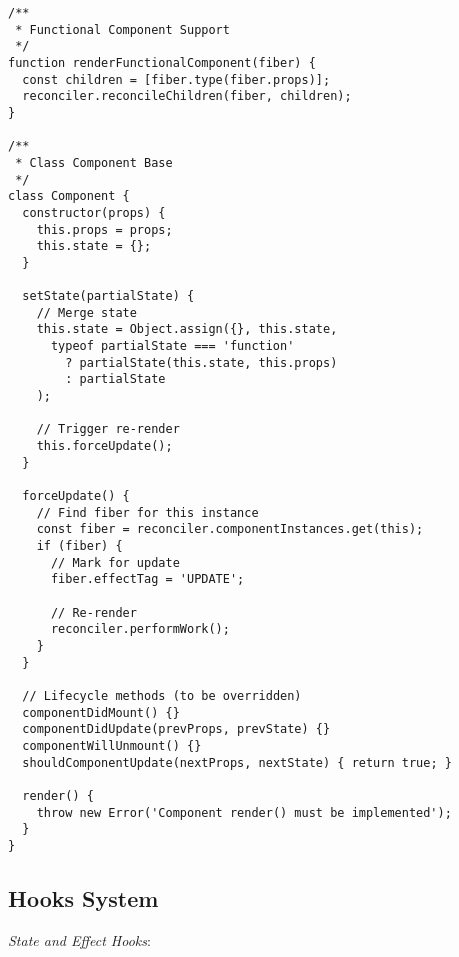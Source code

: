 \documentclass[11pt]{article}
\begin{document}
\begin{verbatim}
/**
 * Functional Component Support
 */
function renderFunctionalComponent(fiber) {
  const children = [fiber.type(fiber.props)];
  reconciler.reconcileChildren(fiber, children);
}

/**
 * Class Component Base
 */
class Component {
  constructor(props) {
    this.props = props;
    this.state = {};
  }
  
  setState(partialState) {
    // Merge state
    this.state = Object.assign({}, this.state, 
      typeof partialState === 'function' 
        ? partialState(this.state, this.props)
        : partialState
    );
    
    // Trigger re-render
    this.forceUpdate();
  }
  
  forceUpdate() {
    // Find fiber for this instance
    const fiber = reconciler.componentInstances.get(this);
    if (fiber) {
      // Mark for update
      fiber.effectTag = 'UPDATE';
      
      // Re-render
      reconciler.performWork();
    }
  }
  
  // Lifecycle methods (to be overridden)
  componentDidMount() {}
  componentDidUpdate(prevProps, prevState) {}
  componentWillUnmount() {}
  shouldComponentUpdate(nextProps, nextState) { return true; }
  
  render() {
    throw new Error('Component render() must be implemented');
  }
}
\end{verbatim}
\subsection{Hooks System}
\label{sec:orgea62c9e}

\emph{State and Effect Hooks}:
\end{document}
